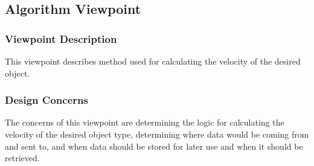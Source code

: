 \documentclass[letterpaper,10pt,onecolumn,draftclsnofoot]{IEEEtran}
\begin{document}
\subsection{Algorithm Viewpoint}
\subsubsection{Viewpoint Description}
This viewpoint describes method used for calculating the velocity of the desired object.

\subsubsection{Design Concerns}
The concerns of this viewpoint are determining the logic for calculating the velocity of the desired object type, determining where data would be coming from and sent to, and when data should be stored for later use and when it should be retrieved.
\end{document}

